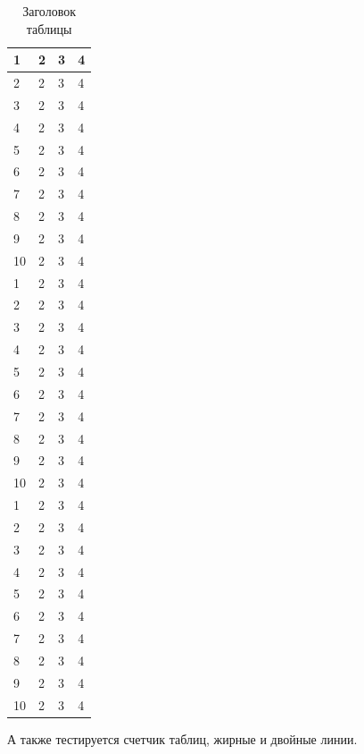 \documentclass[a4paper,14pt]{extarticle}
\begin{document}
\begin{center}
    \begin{longtable}{|p{2cm}|p{3cm}|p{7cm}|p{3cm}|}
    \caption{Заголовок таблицы}\\
    \hline
    1 & 2 & 3 & 4\\ 
    \hline 
    2 & 2 & 3 & 4\\
    \hline
    3 & 2 & 3 & 4\\
    \hline
    4 & 2 & 3 & 4\\
    \hline
    5 & 2 & 3 & 4\\
    \hline
    6 & 2 & 3 & 4\\
    \hline
    7 & 2 & 3 & 4\\
    \hline
    8 & 2 & 3 & 4\\
    \hline
    9 & 2 & 3 & 4\\
    \hline
    10 & 2 & 3 & 4\\
    \hline
    1 & 2 & 3 & 4\\ 
    \hline 
    2 & 2 & 3 & 4\\
    \hline
    3 & 2 & 3 & 4\\
    \hline
    4 & 2 & 3 & 4\\
    \hline
    5 & 2 & 3 & 4\\
    \hline
    6 & 2 & 3 & 4\\
    \hline
    7 & 2 & 3 & 4\\
    \hline
    8 & 2 & 3 & 4\\
    \hline
    9 & 2 & 3 & 4\\
    \hline
    10 & 2 & 3 & 4\\
    \hline
    1 & 2 & 3 & 4\\ 
    \hline 
    2 & 2 & 3 & 4\\
    \hline
    3 & 2 & 3 & 4\\
    \hline
    4 & 2 & 3 & 4\\
    \hline
    5 & 2 & 3 & 4\\
    \hline
    6 & 2 & 3 & 4\\
    \hline
    7 & 2 & 3 & 4\\
    \hline
    8 & 2 & 3 & 4\\
    \hline
    9 & 2 & 3 & 4\\
    \hline
    10 & 2 & 3 & 4\\
    \hline
    
    
    \end{longtable}
\end{center}


А также тестируется счетчик таблиц, жирные и двойные линии.
\end{document}

